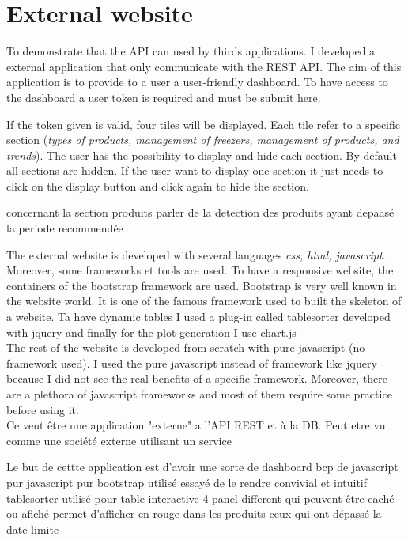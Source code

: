 \section{External website}
To demonstrate that the API can used by thirds applications. I developed a external application that only communicate with the REST API. The aim of this application is to provide to a user a user-friendly dashboard. To have access to the dashboard a user token is required and must be submit here.


If the token given is valid, four tiles will be displayed. Each tile refer to a specific section (\textit{types of products, management of freezers, management of products, and trends}). The user has the possibility to display and hide each section. By default all sections are hidden. If the user want to display one section it just needs to click on the display button and click again to hide the section.


concernant la section produits parler de la detection des produits ayant depaasé la periode recommendée



The external website is developed with several languages \textit{css, html, javascript}. Moreover, some frameworks et tools are used. To have a responsive website, the containers of the bootstrap framework are used. Bootstrap is very well known in the website world. It is one of the famous framework used to built the skeleton of a website. Ta have dynamic tables I used a plug-in called tablesorter developed with jquery  %
and finally for the plot generation I use chart.js \\

The rest of the website is developed from scratch with pure javascript (no framework used). I used the pure javascript instead of framework like jquery because I did not see the real benefits of a specific framework. Moreover, there are a plethora of javascript frameworks and most of them require some practice before using it.\\



Ce veut être une application "externe" a l'API REST et à la DB. Peut etre vu comme une société externe utilisant un service

Le but de cettte application est d'avoir une sorte de dashboard
bcp de javascript pur
javascript pur
bootstrap utilisé
essayé de le rendre convivial et intuitif
tablesorter utilisé pour table interactive 
4 panel different qui peuvent être caché ou afiché
permet d'afficher en rouge dans les produits ceux qui ont dépassé la date limite

